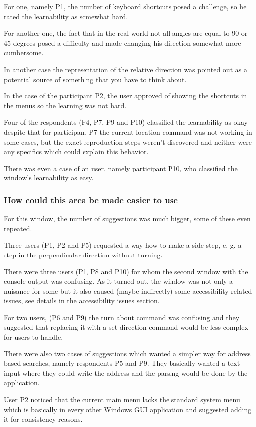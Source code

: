\documentclass[nolof,digital]{fithesis3}
\begin{document}
For one, namely P1, the number of keyboard shortcuts posed a challenge, so he rated the learnability as somewhat hard.

For another one, the fact that in the real world not all angles are equal to 90 or 45 degrees posed a difficulty and made changing his direction somewhat more cumbersome.

In another case the representation of the relative direction was pointed out as a potential source of something that you have to think about.

In the case of the participant P2, the user approved of showing the shortcuts in the menus so the learning was not hard.

Four of the respondents (P4, P7, P9 and P10) classified the learnability as okay despite that for participant P7 the current location command was not working in some cases, but the exact reproduction steps weren't discovered and neither were any specifics which could explain this behavior.

There was even a case of an user, namely participant P10, who classified the window's learnability as easy.
\subsubsection{How could this area be made easier to use}
For this window, the number of suggestions was much bigger, some of these even repeated.

Three users (P1, P2 and P5) requested a way how to make a side step, e. g. a step in the perpendicular direction without turning.

There were three users (P1, P8 and P10) for whom the second window with the console output was confusing. As it turned out, the window was not only a nuisance for some but it also caused (maybe indirectly) some accessibility related issues, see details in the accessibility issues section.

For two users, (P6 and P9) the turn about command was confusing and they suggested that replacing it with a set direction command would be less complex for users to handle.

There were also two cases of suggestions which wanted a simpler way for address based searches, namely respondents P5 and P9. They basically wanted a text input where they could write the address and the parsing would be done by the application.

User P2 noticed that the current main menu lacks the standard system menu which is basically in every other Windows GUI application and suggested adding it for consistency reasons.
\end{document}
